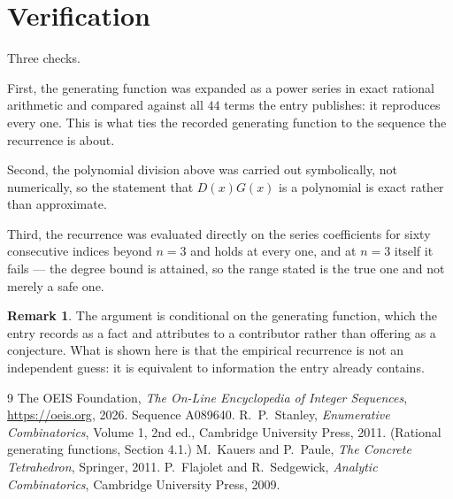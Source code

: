 \documentclass[11pt,a4paper]{article}
\theoremstyle{plain}
\theoremstyle{definition}
\newtheorem{remark}[theorem]{Remark}
\begin{document}
\section{Verification}

Three checks.

First, the generating function was expanded as a power series in exact rational arithmetic and
compared against all $44$ terms the entry publishes: it reproduces every one. This is
what ties the recorded generating function to the sequence the recurrence is about.

Second, the polynomial division above was carried out symbolically, not numerically, so the
statement that $D(x)G(x)$ is a polynomial is exact rather than approximate.

Third, the recurrence was evaluated directly on the series coefficients for sixty consecutive
indices beyond $n=3$ and holds at every one, and at $n=3$ itself it fails --- the
degree bound is attained, so the range stated is the true one and not merely a safe one.

\begin{remark}
The argument is conditional on the generating function, which the entry records as a fact and
attributes to a contributor rather than offering as a conjecture. What is shown here is that
the empirical recurrence is not an independent guess: it is equivalent to information the
entry already contains.
\end{remark}

\begin{thebibliography}{9}
 The OEIS Foundation, \emph{The On-Line Encyclopedia of Integer
Sequences}, \url{https://oeis.org}, 2026. Sequence A089640.
 R.~P.~Stanley, \emph{Enumerative Combinatorics}, Volume 1, 2nd ed.,
Cambridge University Press, 2011. (Rational generating functions, Section 4.1.)
 M.~Kauers and P.~Paule, \emph{The Concrete Tetrahedron}, Springer, 2011.
 P.~Flajolet and R.~Sedgewick, \emph{Analytic Combinatorics}, Cambridge
University Press, 2009.
\end{thebibliography}
\end{document}
